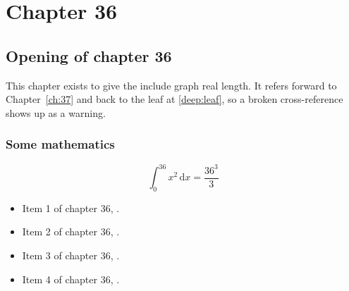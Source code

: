 \chapter{Chapter 36}
\label{ch:36}
\section{Opening of chapter 36}
This chapter exists to give the include graph real length. It refers
forward to Chapter~\ref{ch:37} and back to the leaf
at \ref{deep:leaf}, so a broken cross-reference shows up as a warning.

\subsection{Some mathematics}
\begin{equation}
  \int_0^{36} x^{2} \, \mathrm{d}x = \frac{36^{3}}{3}
\end{equation}

\begin{itemize}
  \item Item 1 of chapter 36, .
  \item Item 2 of chapter 36, .
  \item Item 3 of chapter 36, .
  \item Item 4 of chapter 36, .
\end{itemize}

